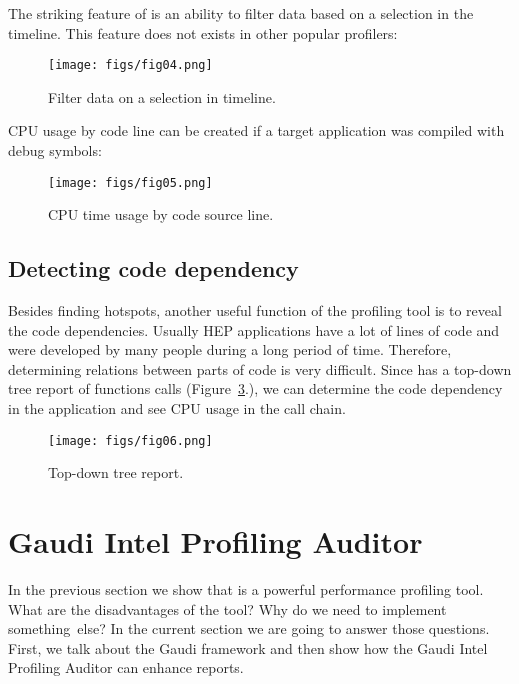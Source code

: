 \documentclass[a4paper]{jpconf}
\begin{document}
The striking feature of \amp is an ability to filter data based on a selection in the timeline. This feature 
does not exists in other popular profilers:

\begin{figure}[H]
\begin{minipage}{\textwidth}
\texttt{[image: figs/fig04.png]}
\caption{\label{fig04}Filter data on a selection in timeline.}
\end{minipage}
\end{figure}

CPU usage by code line can be created if a target application was compiled with debug symbols:

\begin{figure}[H]
\begin{minipage}{\textwidth}
\texttt{[image: figs/fig05.png]}
\caption{\label{fig05}CPU time usage by code source line.}
\end{minipage}
\end{figure}

\subsection{Detecting code dependency}

Besides finding hotspots, another useful function of the profiling tool is to reveal the code dependencies. 
Usually HEP applications have a lot of lines of code and were developed by many people during a long period of time. 
Therefore, determining relations between parts of code is very difficult. Since \amp  has a top-down tree report of 
functions calls (Figure~\ref{fig06}.), we can determine the code dependency in the application and see CPU usage in the
call chain.

\begin{figure}[H]
\begin{minipage}{\textwidth}
\texttt{[image: figs/fig06.png]}
\caption{\label{fig06}Top-down tree report.}
\end{minipage}
\end{figure}

\section{Gaudi Intel Profiling Auditor}

In the previous section we show that \iamp is a powerful performance profiling tool. What are the disadvantages of the tool? 
Why do we need to implement something~else? In the current section we are going to answer those questions. 
First, we talk about the Gaudi framework and then show how the Gaudi Intel Profiling Auditor can enhance \amp reports.
\end{document}
